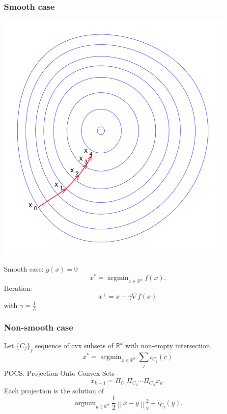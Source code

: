 \documentclass[aspectratio=169]{beamer}
\newcommand{\rd}{\mathbb{R}^d}
\newcommand{\normtwosq}[1]{\left\|#1\right\|_2^2}
\DeclareMathOperator*{\argmin}{argmin}
\begin{document}
		\begin{frame}
			\frametitle{Smooth case}
			\begin{minipage}{.45\textwidth}
			\includegraphics[width=\textwidth]{img/gradientdescent}
			\end{minipage}\qquad
			\begin{minipage}{.45\textwidth}
			Smooth case: $g(x) = 0$
			\begin{equation}\nonumber
			x^*=\argmin_{x\in\rd}f(x).
			\end{equation}
			Iteration:
			\begin{equation}
			\nonumber
			x^+ = x - \gamma\nabla f(x)
			\end{equation}
			with $\gamma=\frac{1}{L}$
			\end{minipage}
		\end{frame}

		\begin{frame}
		\frametitle{Non-smooth case}
		Let $\{C_j\}_j$ sequence of cvx subsets of $\rd$ with non-empty intersection,
		\begin{equation}
		\nonumber
		x^*=\argmin_{x\in \rd}\sum_j \iota_{C_j}(c)
		\end{equation}
		\pause
		POCS: Projection Onto Convex Sets
		\begin{equation}
		\nonumber
		x_{k+1} = \Pi_{C_1}\Pi_{C_2}\cdots\Pi_{C_N} x_k.
		\end{equation}
		\pause
		Each projection is the solution of 
		\begin{equation}
		\nonumber
		\argmin_{y\in \rd}\frac{1}{2}\normtwosq{x-y} + \iota_{C_j}(y).
		\end{equation}
		\end{frame}
		
\end{document}
